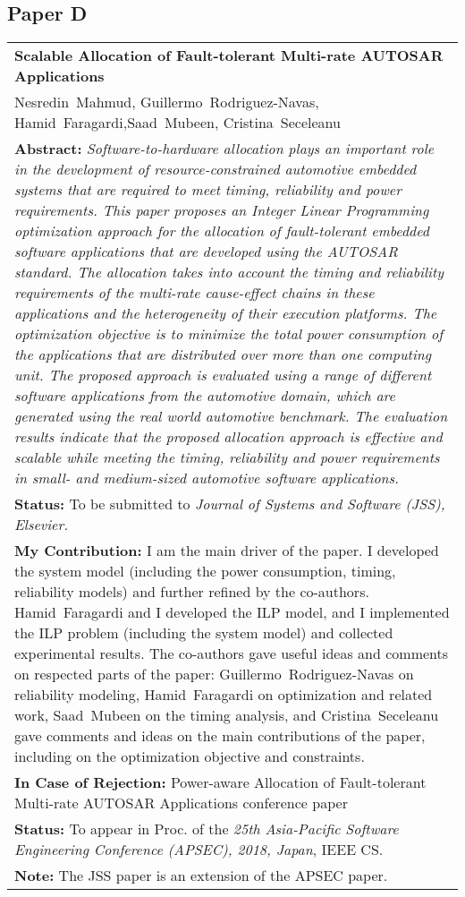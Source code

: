 \subsection{Paper D}
\begin{tabular}{p{\textwidth}}
\textbf{Scalable Allocation of Fault-tolerant Multi-rate AUTOSAR Applications}\\%
Nesredin~Mahmud, Guillermo~Rodriguez-Navas, Hamid~Faragardi,Saad~Mubeen, Cristina~Seceleanu\\[6pt]%
\textbf{Abstract:} \textit{Software-to-hardware allocation plays an important
role in the development of resource-constrained automotive
embedded systems that are required to meet timing, reliability
and power requirements. This paper proposes an Integer Linear
Programming optimization approach for the allocation of fault-tolerant
embedded software applications that are developed using
the AUTOSAR standard. The allocation takes into account the
timing and reliability requirements of the multi-rate cause-effect
chains in these applications and the heterogeneity of their
execution platforms. The optimization objective is to minimize the
total power consumption of the applications that are distributed
over more than one computing unit. The proposed approach is
evaluated using a range of different software applications from
the automotive domain, which are generated using the real world
automotive benchmark. The evaluation results indicate
that the proposed allocation approach is effective and scalable
while meeting the timing, reliability and power requirements in
small- and medium-sized automotive software applications.
}\\[6pt]%
\textbf{Status: }To be submitted to \textit{Journal of Systems and Software (JSS), Elsevier.}\\%
\textbf{My Contribution: }I am the main driver of the paper. I developed the system model (including the power consumption, timing, reliability models) and further refined by the co-authors. Hamid~Faragardi and I developed the ILP model, and I implemented the ILP problem (including the system model) and collected experimental results. The co-authors gave useful ideas and comments on respected parts of the paper: Guillermo~Rodriguez-Navas on reliability modeling, Hamid~Faragardi on optimization and related work, Saad~Mubeen on the timing analysis, and Cristina~Seceleanu gave comments and ideas on the main contributions of the paper, including on the optimization objective and constraints.\\%
\textbf{In Case of Rejection: }Power-aware Allocation of Fault-tolerant Multi-rate AUTOSAR Applications conference paper\\
\textbf{Status:} To appear in Proc. of the \textit{25th Asia-Pacific Software Engineering Conference (APSEC), 2018, Japan}, IEEE CS.\\
\textbf{Note: }The JSS paper is an extension of the APSEC paper.\\
\end{tabular}

